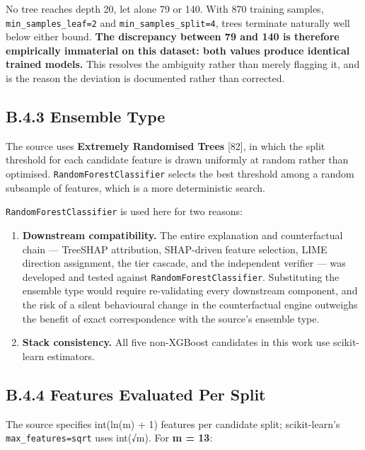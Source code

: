 No tree reaches depth 20, let alone 79 or 140. With 870 training samples, \texttt{min\_samples\_leaf=2} and \texttt{min\_samples\_split=4}, trees terminate naturally well below either bound. \textbf{The discrepancy between 79 and 140 is therefore empirically immaterial on this dataset: both values produce identical trained models.} This resolves the ambiguity rather than merely flagging it, and is the reason the deviation is documented rather than corrected.

\hypertarget{b.4.3-ensemble-type}{%
\subsection{B.4.3 Ensemble Type}\label{b.4.3-ensemble-type}}

The source uses \textbf{Extremely Randomised Trees} {[}82{]}, in which the split threshold for each candidate feature is drawn uniformly at random rather than optimised. \texttt{RandomForestClassifier} selects the best threshold among a random subsample of features, which is a more deterministic search.

\texttt{RandomForestClassifier} is used here for two reasons:

\begin{enumerate}
\def\labelenumi{\arabic{enumi}.}
\tightlist
\item
  \textbf{Downstream compatibility.} The entire explanation and counterfactual chain --- TreeSHAP attribution, SHAP-driven feature selection, LIME direction assignment, the tier cascade, and the independent verifier --- was developed and tested against \texttt{RandomForestClassifier}. Substituting the ensemble type would require re-validating every downstream component, and the risk of a silent behavioural change in the counterfactual engine outweighs the benefit of exact correspondence with the source's ensemble type.
\item
  \textbf{Stack consistency.} All five non-XGBoost candidates in this work use scikit-learn estimators.
\end{enumerate}

\hypertarget{b.4.4-features-evaluated-per-split}{%
\subsection{B.4.4 Features Evaluated Per Split}\label{b.4.4-features-evaluated-per-split}}

The source specifies int(ln(m) + 1) features per candidate split; scikit-learn's \texttt{max\_features=\textquotesingle{}sqrt\textquotesingle{}} uses int(√m). For \textbf{m = 13}:

